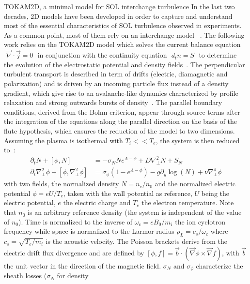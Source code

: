 \documentclass[a4paper,12pt]{article} %
\begin{document}
\begin{section}{TOKAM2D, a minimal model for SOL interchange turbulence}
In the last two decades, 2D models have been developed in order to capture and understand most of the essential
characteristics of SOL turbulence observed in experiments.
As a common point, most of them rely on an interchange model ~\cite{Nedospasov,Garbet,Esel,Bisai}. The following work relies 
on the TOKAM2D model which solves the current 
balance equation $\text{~}\vec{\nabla}\cdot\vec{j}=0\text{~}$ in conjunction with the 
continuity equation $\text{~}d_tn=S\text{~}$ to determine the evolution of the electrostatic potential and
density fields~\cite{Sarazin}. The perpendicular turbulent
transport is described in term of drifts (electric, diamagnetic and polarization) and is driven by an
incoming particle flux instead of a density gradient, which give rise to an avalanche-like dynamics characterized
by profile relaxation and strong outwards bursts of density~\cite{Sarazin}. The parallel boundary conditions, 
derived from the Bohm 
criterion, appear through source terms after the integration of the equations along the parallel direction on the basis
of the flute hypothesis, which ensures the reduction of the model to two dimensions.
Assuming the plasma is isothermal with $T_i<<T_e$, the system is then reduced to~\cite{Sarazin}:
\begin{align}
\label{eqDensity}\partial_tN+\left[\phi,N\right]&=-\sigma_N N e^{\Lambda-\phi}+D\nabla^2_\perp N +S_N\\
\label{eqCurrent}\partial_t\nabla^2_\perp \phi+\left[\phi,\nabla^2_\perp \phi\right]&=\sigma_\phi(1-e^{\Lambda-\phi})-g\partial_y\log(N)+\nu\nabla^4_\perp \phi
\end{align}
with two fields, the normalized density $N=n_e/n_0$ and the normalized electric potential $\phi=eU/T_e$, taken
with the wall potential as reference, $U$ being the electric potential, $e$ the electric charge and $T_e$ the 
electron temperature. Note that $n_0$ is an arbitrary reference density (the system is independent of the value of $n_0$).
Time is normalized to the inverse of $\omega_c=eB_0/m_i$ the ion cyclotron frequency while space is normalized 
to the Larmor radius $\rho_L=c_s/\omega_c$ where $c_s=\sqrt{T_e/m_i}$ is the acoustic velocity. 
The Poisson brackets derive from the electric drift flux divergence and are defined by 
$[\phi,f]=\vec{b}\cdot(\vec{\nabla} \phi\times\vec{\nabla} f)$, with $\vec{b}$ the unit vector in the direction 
of the magnetic field. $\sigma_N$ and $\sigma_\phi$ characterize the sheath losses ($\sigma_N$ for density 

\end{section}
\end{document}
